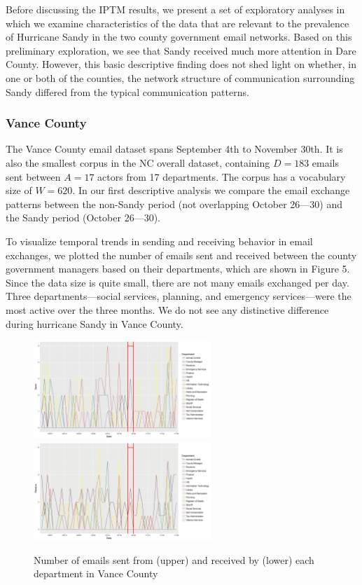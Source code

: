 \documentclass[a4paper]{article}
\begin{document}
Before discussing the IPTM results, we present a set of exploratory analyses in which we examine characteristics of the data that are relevant to the prevalence of Hurricane Sandy in the two county government email networks. Based on this preliminary exploration, we see that Sandy received much more attention in Dare County. However, this basic descriptive finding does not shed light on whether, in one or both of the counties, the network structure of communication surrounding Sandy differed from the typical communication patterns. 
 
 \subsubsection{Vance County}\label{subsubsec:VanceEDA} 
The Vance County email dataset spans September 4th to November 30th. It is also the smallest corpus in the NC overall dataset, containing $D=183$ emails sent between $A=17$ actors from 17 departments. The corpus has a vocabulary size of $W=620$.  In our first descriptive analysis we compare the email exchange patterns between the non-Sandy period (not overlapping October 26---30) and the Sandy period (October 26---30). 
 
 To visualize temporal trends in sending and receiving behavior in email exchanges, we plotted the number of emails sent and received between the county government managers based on their departments, which are shown in Figure 5. Since the data size is quite small, there are not many emails exchanged per day.  Three departments---social services, planning, and emergency services---were the most active over the three months. We do not see any distinctive difference during hurricane Sandy in Vance County.
  \begin{figure}[H]
  	\centering
  	  	\includegraphics[width=0.6\textwidth]{plots/VanceSend-1.png} 
  	  	\includegraphics[width=0.6\textwidth]{plots/VanceReceive-1.png} 
  	\label{fig:SendReceiveVance}
  	\caption{Number of emails sent from (upper) and received by (lower) each department in Vance County}
  \end{figure}
  
\end{document}
